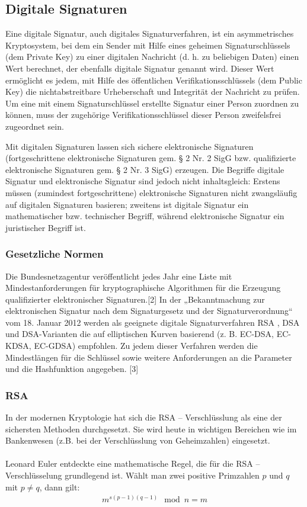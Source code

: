 \subsection*{Digitale Signaturen}
Eine digitale Signatur, auch digitales Signaturverfahren, ist ein asymmetrisches Kryptosystem, bei dem ein Sender mit Hilfe eines geheimen Signaturschlüssels (dem Private Key) zu einer digitalen Nachricht (d. h. zu beliebigen Daten) einen Wert berechnet, der ebenfalls digitale Signatur genannt wird. Dieser Wert ermöglicht es jedem, mit Hilfe des öffentlichen Verifikationsschlüssels (dem Public Key) die nichtabstreitbare Urheberschaft und Integrität der Nachricht zu prüfen. Um eine mit einem Signaturschlüssel erstellte Signatur einer Person zuordnen zu können, muss der zugehörige Verifikationsschlüssel dieser Person zweifelsfrei zugeordnet sein.

Mit digitalen Signaturen lassen sich sichere elektronische Signaturen (fortgeschrittene elektronische Signaturen gem. § 2 Nr. 2 SigG bzw. qualifizierte elektronische Signaturen gem. § 2 Nr. 3 SigG) erzeugen. Die Begriffe digitale Signatur und elektronische Signatur sind jedoch nicht inhaltsgleich: Erstens müssen (zumindest fortgeschrittene) elektronische Signaturen nicht zwangsläufig auf digitalen Signaturen basieren; zweitens ist digitale Signatur ein mathematischer bzw. technischer Begriff, während elektronische Signatur ein juristischer Begriff ist.
\subsubsection{Gesetzliche Normen}
Die Bundesnetzagentur veröffentlicht jedes Jahr eine Liste mit Mindestanforderungen für kryptographische Algorithmen für die Erzeugung qualifizierter elektronischer Signaturen.[2] In der „Bekanntmachung zur elektronischen Signatur nach dem Signaturgesetz und der Signaturverordnung“ vom 18. Januar 2012 werden als geeignete digitale Signaturverfahren RSA , DSA und DSA-Varianten die auf elliptischen Kurven basierend (z. B. EC-DSA, EC-KDSA, EC-GDSA) empfohlen. Zu jedem dieser Verfahren werden die Mindestlängen für die Schlüssel sowie weitere Anforderungen an die Parameter und die Hashfunktion angegeben. [3]
\subsubsection{RSA}
In der modernen Kryptologie hat sich die RSA – Verschlüsslung als eine der
sichersten Methoden durchgesetzt. Sie wird heute in wichtigen Bereichen wie  im
Bankenwesen (z.B. bei der Verschlüsslung von Geheimzahlen) eingesetzt.
\\\\
Leonard Euler entdeckte eine mathematische Regel, die für die RSA –
Verschlüsselung grundlegend ist. Wählt man zwei positive Primzahlen $p$ und $q$ mit $p \neq q$, dann gilt:
\begin{equation}
	\begin{split}
		m^{s(p-1)(q-1)}\mod n = m
 	\end{split}
\end{equation}

